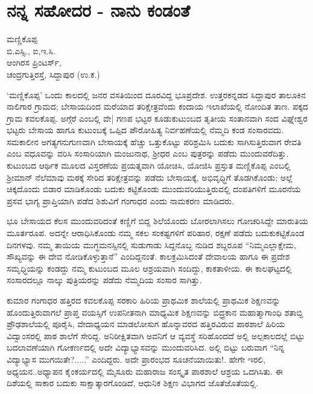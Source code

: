 \chapter{ನನ್ನ  ಸಹೋದರ - ನಾನು ಕಂಡಂತೆ}

\begin{center}
\smallskip

ಮಣ್ಣಿಕೊಪ್ಪ\\
ಬಿ.ಎಸ್ಸಿ., ಐ,ಇ.ಸಿ.\\
ಆಂಗಿರಸ ಪ್ರಿಂಟರ್ಸ್,\\
ಚಂದ್ರಗುತ್ತಿರಸ್ತೆ, ಸಿದ್ದಾಪುರ  (ಉ.ಕ.)
\end{center}
`ಮಣ್ಣಿಕೊಪ್ಪ'  ಒಂದು ಕಾಲದಲ್ಲಿ ಜನರ ವಸತಿಯಿಂದ ದೂರವಿದ್ದ ಭೂಪ್ರದೇಶ. ಉತ್ತರಕನ್ನಡದ ಸಿದ್ದಾಪುರ ತಾಲೂಕಿನ  ನಾಲಿಗಾರ ಗ್ರಾಮದ; ಬೇಸಾಯದಿಂದ ಮರೆಯಾದ ತರಿಕ್ಷೇತ್ರವೆಂದು ಕಂದಾಯ ಇಲಾಖೆಯಲ್ಲಿ ನೋಂದಿತ ತಾಣ.  ಪಕ್ಕದ ಗ್ರಾಮ ಕವಲಕೊಪ್ಪ. ಅಗ್ಗೆರೆ ಎಂಬಲ್ಲಿ ವೇ| ಗಣಪ ಭಟ್ಟರ ಕೂಡುಕುಟುಂಬದ ತೃತೀಯ ಸಂತಾನವಾಗಿ ಸಂದ ವಿಘ್ನೇಶ್ವರ ಭಟ್ಟರು ಬೇಸಾಯ ಹಾಗೂ ಕುಟುಂಬಕ್ಕೆ ಒಪ್ಪಿದ ಪೌರೋಹಿತ್ಯ ನಿರ್ವಹಣೆಯಲ್ಲಿ ನೆಮ್ಮದಿ ಕಂಡ ಸಂಸಾರವದು.  ಸಮಕಾಲೀನ ಅಗತ್ಯಗನುಗುಣವಾಗಿ ಬೇಸಾಯಕ್ಕೆ ಹೆಚ್ಚು ಒತ್ತುಕೊಟ್ಟು ಪರಿಶ್ರಮಿಸಿ ಬದುಕು ಸಾಗಿಸುತ್ತಿರುವಾಗ ರೇವತಿ ಎಂಬ ವಧೂವನ್ನು ವರಿಸಿ ಸಂಸಾರಿಯಾಗಿ ಮಂಜುನಾಥ, ಶ್ರೀಧರ ಎಂಬ ಪುತ್ರರನ್ನು  ಪಡೆದು  ಮುಂದುವರೆದಿತ್ತು.  ಕುಟುಂಬದ ಆರ್ಥಿಕ ಮೂಲದ ವಿಸ್ತರಣೆಯ  ಪ್ರಯತ್ನವಾಗಿ  ಯೋಚಿಸಿ, ಯೋಜಿಸಿ  ಪ್ರಸ್ತುತ ಮಣ್ಣಿಕೊಪ್ಪ ಎಂಬಲ್ಲಿ ಶ್ರೀಮಾನ್ ನೆಲೆಮಾವು  ಮಠಕ್ಕೆ ಸೇರಿದ ತರಿಕ್ಷೇತ್ರವನ್ನು  ಪಡೆದು ಬೇಸಾಯಕ್ಕೆ,  ಅಭಿವೃಧ್ಧಿಗೆ ತೊಡಗಿಕೊಂಡು;  ಅಲ್ಲೆ ಚಿಕ್ಕದೊಂದು ಬಿಡಾರ ಮಾಡಿಕೊಂಡು ಬದುಕು ಕಟ್ಟಿಕೊಂಡು ಮುಂದುವರಿಯುತ್ತಿರುವಲ್ಲಿ  ದಂಪತಿಗಳಿಗೆ ಮೂರನೆಯ ಪ್ರಸವ ಭಾಗ್ಯ ಪ್ರಾಪ್ತಿಯಾಗಿ ಪಡೆದ ಶಿಶುವಿಗೆ  ಗಂಗಾಧರ ಎಂದು ನಾಮಕರಣ ಮಾಡಿದರು.

ಭೂ ಬೇಸಾಯದ ಕೆಲಸ ಮುಂದುವರಿದಂತೆ ಕಣ್ಣಿಗೆ ಬಿದ್ದ  ಶಿಲೆಯೊಂದು ಬೋರಲಾಗಿಸಲು ಗೋಚರಿಸಿದ್ದೇ  ಮಾರುತಿಯ  ಮೂರ್ತರೂಪ.  ಅದನ್ನೇ ಆರಾಧಿಸಿಕೊಂಡು  ನಮ್ಮ ಸಕಲ ಸಂಕಷ್ಟಗಳಿಗೆ ಪರಿಹಾರ, ರಕ್ಷಣೆ ಪಡೆದು ಬದುಕುಕಟ್ಟಿಕೊಂಡ ದಿನಗಳವು. ನಮ್ಮ ತಾಯಿಯ ಮುಗ್ಧಮನಸ್ಸಿನಲ್ಲಿ ಸುಡುಗಾಡು ಸಿದ್ದನೊಬ್ಬ ನುಡಿದ ಶಬ್ದರೂಪ ``ನಿಮ್ಮಎಲ್ಲಾಕ್ಷೇಮ, ಸೌಖ್ಯವನ್ನು ಈ ದೇವ ನೋಡಿಕೊಳ್ಳುತ್ತಾನೆ'' ಎಂದಿದ್ದನಂತೆ.  ಕಾಲಕ್ರಮಿಸಿದಂತೆ   ದೇವಾಲಯ ಹಾಗೂ  ಈ ಪ್ರದೇಶ  ಸಮೃಧ್ಧಿಯನ್ನು ಕಂಡದ್ದು ನಮ್ಮ ಕುಟುಂಬದ ಮೂಲ ಆಶ್ರಯವಾಗಿ ಸಂದಿದ್ದು, ಕಾಕತಾಳೀಯ. ಈ ಕಾಲಘಟ್ಟದಲ್ಲಿ  ಸಂಸಾರದಲ್ಲೂ ನಾಲ್ಕು ಪುತ್ರಿಯರನ್ನು  ಪಡೆದು ನೆಮ್ಮದಿಯ ಸಂಸಾರ ಸಾಗಿತ್ತು.	
	
ಕುಮಾರ ಗಂಗಾಧರ ಹತ್ತಿರದ ಕವಲಕೊಪ್ಪ ಸರಕಾರಿ ಹಿರಿಯ ಪ್ರಾಥಮಿಕ ಶಾಲೆಯಲ್ಲಿ ಪ್ರಾಥಮಿಕ ಶಿಕ್ಷಣವನ್ನು ಹೊಂದುತ್ತಿರುವಾಗಲೆ ಪ್ರಾಪ್ತ ವಯಸ್ಸಿಗೆ ಉಪನೀತನಾಗಿ  ಮಾಧ್ಯಮಿಕ ಶಿಕ್ಷಣವನ್ನು ಬಿದ್ರ್ರಕಾನ ಮಹಾತ್ಮಾಗಾಂಧಿ ಶತಾಬ್ದಿ ಪ್ರೌಢಶಾಲೆಯಲ್ಲಿ ಪೂರೈಸಿ, ವೇದಾಧ್ಯಯನ ಮಾಡಲೋಸುಗ ಹೊನ್ನಾವರದ ಹತ್ತಿರವಿರುವ ಪಾಠಶಾಲೆ ಹಿರಿಯ ವಿದ್ವಾಂಸರಲ್ಲಿ ಪಾಠ ಶಾಲೆಗೆ ಸೇರಿದ್ದ.  ಅನಿರೀಕ್ಷಿತವಾಗಿ ಅವನಿಗೆ ಆ ವ್ಯವಸ್ಥೆ ಸರಿಹೊಂದದೆ ಅಲ್ಲಿ ಅಲ್ಪಕಾಲದಲ್ಲೆ ಬಿಟ್ಟು ಬದಲಾವಣೆಯಾಗಿ ಗೋಕರ್ಣದಲ್ಲಿ ಅದೇ ವಿದ್ಯಾಭ್ಯಾಸವನ್ನು ಮುಂದುವರಿಸಿದ. ಅಲ್ಲಿ ಬಿಟ್ಟು  ಬರುವಾಗ ``ನಿನ್ನ ವಿದ್ಯಾಭ್ಯಾಸ ಮುಗಯಿತೇ?.....'' ಎಂದಿದ್ದರು. ಅದೇ ಪ್ರಾರಂಭದ  ಸೂಚನೆಯಾಯಿತು!.  ಹೇಗೇ ಇರಲಿ, ಅಧ್ಯಯನ..ಅಧ್ಯಾಪನ ಕೈಂಕರ್ಯದಲ್ಲಿ  ಮೈಸೂರು ಮಹಾರಾಜ ಸಂಸ್ಕೃತ ಪಾಠಶಾಲೆ ಆಶ್ರಯ ಒದಗಿಸಿತು. ಈ ದಿಶೆಯಲ್ಲಿ  ಸಾಕಾರ  ಬದುಕು ಸಾಕ್ಷಾತ್ಕಾರಗೊಂಡಿದೆ, ಆಧುನಿಕ ಶಿಕ್ಷಣ ವಿಭಾಗದ ಜೊತೆಜೊತೆಯಲ್ಲಿ.

